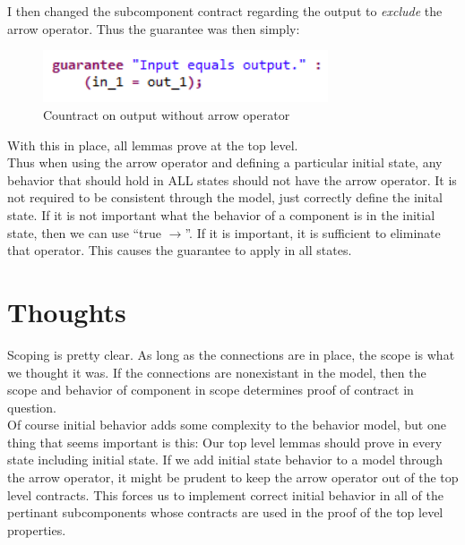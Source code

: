 \documentclass{article}
\begin{document}
I then changed the subcomponent contract regarding the output to \textit{exclude} the arrow operator. Thus the guarantee was then simply: \\
\begin{figure}[h]
\begin{center}
\includegraphics[width=0.75\textwidth]{images/output_contract} 
\caption{Countract on output without arrow operator}
\label{fig:output_contract}
\end{center}
\end{figure}

With this in place, all lemmas prove at the top level. \\

Thus when using the arrow operator and defining a particular initial state, any behavior that should hold in ALL states should not have the arrow operator. It is not required to be consistent through the model, just correctly define the inital state. If it is not important what the behavior of a component is in the initial state, then we can use ``true $\rightarrow$''. If it is important, it is sufficient to eliminate that operator. This causes the guarantee to apply in all states.


\section{Thoughts}

Scoping is pretty clear. As long as the connections are in place, the scope is what we thought it was. If the connections are nonexistant in the model, then the scope and behavior of component in scope determines proof of contract in question. \\

Of course initial behavior adds some complexity to the behavior model, but one thing that seems important is this: Our top level lemmas should prove in every state including initial state. If we add initial state behavior to a model through the arrow operator, it might be prudent to keep the arrow operator out of the top level contracts. This forces us to implement correct initial behavior in all of the pertinant subcomponents whose contracts are used in the proof of the top level properties.
\end{document}
